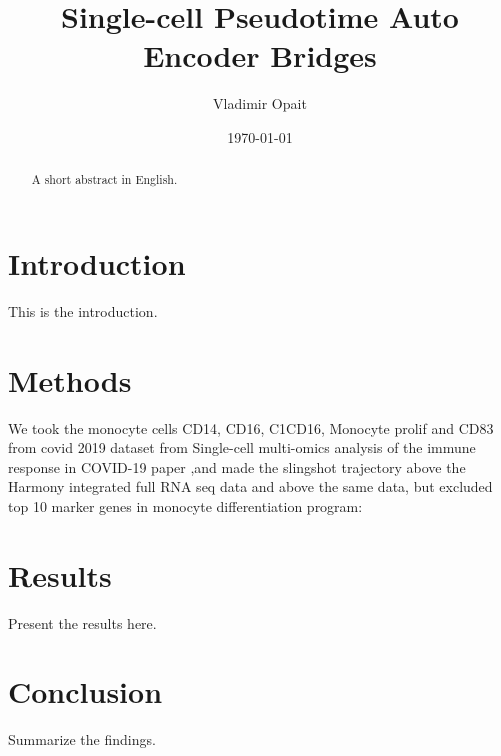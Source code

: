 \documentclass[12pt,a4paper]{article}
\title{Single-cell Pseudotime Auto Encoder Bridges}
\author{Vladimir Opait}
\date{\today}
\begin{document}
\maketitle

\begin{abstract}
A short abstract in English.
\end{abstract}

\section{Introduction}
This is the introduction.

\section{Methods}
We took the monocyte cells CD14, CD16, C1CD16, Monocyte prolif and CD83 from covid 2019 dataset
from Single-cell multi-omics analysis of the immune response in COVID-19 paper
\cite{stephenson2021single},and made the slingshot trajectory above the Harmony integrated 
full RNA seq data and above the same data, but excluded top 10 marker genes in monocyte 
differentiation program: 


\section{Results}
Present the results here.

\section{Conclusion}
Summarize the findings.



\end{document}
